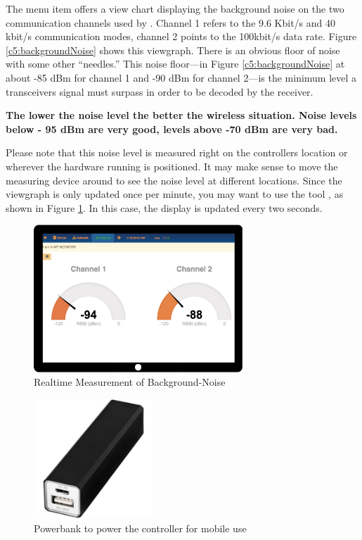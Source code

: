 The menu item  offers a view chart displaying the background 
noise on the two communication channels used by \zwave. Channel 1 refers to the 9.6 Kbit/s 
and 40 kbit/s communication modes, channel 2 points to the 100kbit/s data rate.
Figure \ref{c5:backgroundNoise} shows this viewgraph. There is an obvious floor of 
noise with some other ``needles.'' This noise floor---in Figure \ref{c5:backgroundNoise} 
at about -85 dBm for channel 1 and -90 dBm for channel 2---is the minimum level a \zwave 
transceivers signal must surpass in order to be decoded by the \zwave receiver.

\textbf{The lower the noise level the better the wireless situation.
Noise levels below - 95 dBm are very good, levels above -70 dBm are very bad.}

Please note that this noise level is measured right on the controllers location or wherever 
the hardware running \zway is positioned. It may make sense to move the measuring device around to see the 
noise level at different locations. Since the  viewgraph is 
only updated once per minute, you may want to use the tool , as 
shown in Figure \ref{c5:noisegauge}. In this case, the display is updated every two seconds.

\begin{figure}
\begin{center}
\includegraphics[width=0.7\textwidth]{pngs/cap8/c5noisegauge.pdf}
\caption{Realtime Measurement of Background-Noise}
\label{c5:noisegauge}
\end{center}
\end{figure}

\begin{figure}
\begin{center}
\includegraphics[width=0.4\textwidth]{pngs/cap8/powerbank.jpg}
\caption{Powerbank to power the \zway controller for mobile use}
\label{c5:powerbank}
\end{center}
\end{figure}

